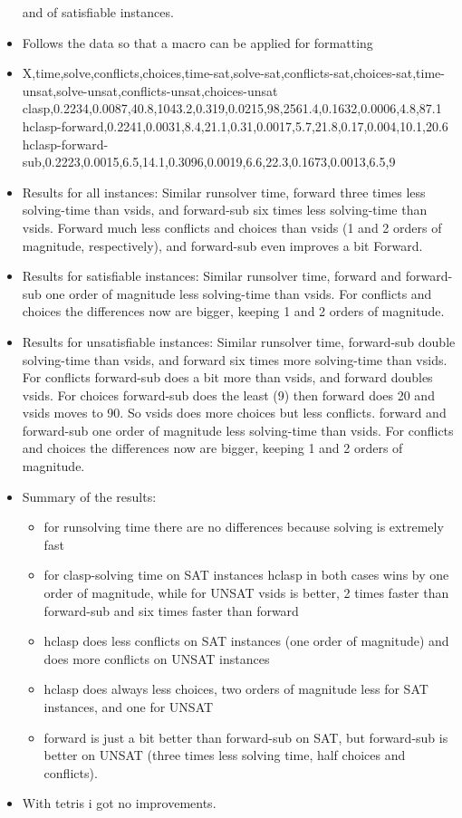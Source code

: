 \begin{itemize}
and of satisfiable instances.
\item 
Follows the data so that a macro can be applied for formatting
\item
X,time,solve,conflicts,choices,time-sat,solve-sat,conflicts-sat,choices-sat,time-unsat,solve-unsat,conflicts-unsat,choices-unsat
clasp,0.2234,0.0087,40.8,1043.2,0.319,0.0215,98,2561.4,0.1632,0.0006,4.8,87.1
hclasp-forward,0.2241,0.0031,8.4,21.1,0.31,0.0017,5.7,21.8,0.17,0.004,10.1,20.6
hclasp-forward-sub,0.2223,0.0015,6.5,14.1,0.3096,0.0019,6.6,22.3,0.1673,0.0013,6.5,9
\item
Results for all instances:
Similar runsolver time, 
forward three times less solving-time than vsids, 
and forward-sub six times less solving-time than vsids. 
Forward much less conflicts and choices than vsids
(1 and 2 orders of magnitude, respectively), 
and forward-sub even improves a bit Forward.
\item
Results for satisfiable instances:
Similar runsolver time, 
forward and forward-sub one order of magnitude less solving-time than vsids.
For conflicts and choices the differences now are bigger, 
keeping 1 and 2 orders of magnitude.
\item
Results for unsatisfiable instances:
Similar runsolver time,
forward-sub double solving-time than vsids, 
and forward six times more solving-time than vsids.
For conflicts forward-sub does a bit more than vsids, 
and forward doubles vsids.
For choices forward-sub does the least (9) then forward does 20 and vsids moves to 90.
So vsids does more choices but less conflicts. 
forward and forward-sub one order of magnitude less solving-time than vsids.
For conflicts and choices the differences now are bigger, 
keeping 1 and 2 orders of magnitude.
\item Summary of the results: 
\begin{itemize}
\item
for runsolving time there are no differences because solving is extremely fast
\item 
for clasp-solving time on SAT instances hclasp in both cases wins by one order of magnitude,
while for UNSAT vsids is better, 2 times faster than forward-sub and six times faster than forward
\item 
hclasp does less conflicts on SAT instances (one order of magnitude) and does more conflicts on UNSAT instances
\item 
hclasp does always less choices, two orders of magnitude less for SAT instances, and one for UNSAT
\item forward is just a bit better than forward-sub on SAT, 
but forward-sub is better on UNSAT (three times less solving time, half choices and conflicts).
\end{itemize}
\item With tetris i got no improvements.

\end{itemize}

